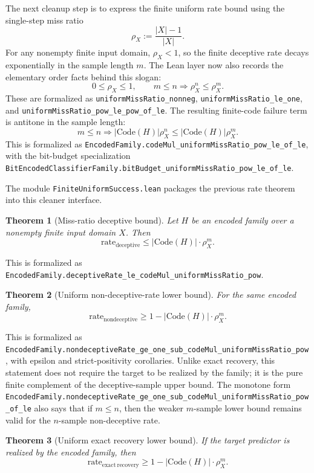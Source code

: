 \documentclass[11pt]{article}
\newtheorem{theorem}{Theorem}[section]
\theoremstyle{remark}
\begin{document}
The next cleanup step is to express the finite uniform rate bound using the
single-step miss ratio
\[
  \rho_X := \frac{|X|-1}{|X|}.
\]
For any nonempty finite input domain, \(\rho_X < 1\), so the finite deceptive
rate decays exponentially in the sample length \(m\).  The Lean layer now also
records the elementary order facts behind this slogan:
\[
  0 \le \rho_X \le 1,\qquad
  m \le n \Rightarrow \rho_X^n \le \rho_X^m.
\]
These are formalized as
\texttt{uniformMissRatio\_nonneg}, \texttt{uniformMissRatio\_le\_one}, and
\texttt{uniformMissRatio\_pow\_le\_pow\_of\_le}.  The resulting finite-code
failure term is antitone in the sample length:
\[
  m \le n \Rightarrow
  |\mathrm{Code}(H)|\rho_X^n \le |\mathrm{Code}(H)|\rho_X^m.
\]
This is formalized as
\texttt{EncodedFamily.codeMul\_uniformMissRatio\_pow\_le\_of\_le}, with the
bit-budget specialization
\texttt{BitEncodedClassifierFamily.bitBudget\_uniformMissRatio\_pow\_le\_of\_le}.

The module \texttt{FiniteUniformSuccess.lean} packages the previous rate theorem
into this cleaner interface.

\begin{theorem}[Miss-ratio deceptive bound]
Let \(H\) be an encoded family over a nonempty finite input domain \(X\).  Then
\[
  \mathrm{rate}_{\mathrm{deceptive}}
  \le
  |\mathrm{Code}(H)| \cdot \rho_X^m.
\]
\end{theorem}

\noindent
This is formalized as
\texttt{EncodedFamily.deceptiveRate\_le\_codeMul\_uniformMissRatio\_pow}.

\begin{theorem}[Uniform non-deceptive-rate lower bound]
For the same encoded family,
\[
  \mathrm{rate}_{\mathrm{nondeceptive}}
  \ge
  1 - |\mathrm{Code}(H)| \cdot \rho_X^m.
\]
\end{theorem}

\noindent
This is formalized as
\texttt{EncodedFamily.nondeceptiveRate\_ge\_one\_sub\_codeMul\_uniformMissRatio\_pow},
with epsilon and strict-positivity corollaries.  Unlike exact recovery, this
statement does not require the target to be realized by the family; it is the
pure finite complement of the deceptive-sample upper bound.  The monotone form
\texttt{EncodedFamily.nondeceptiveRate\_ge\_one\_sub\_codeMul\_uniformMissRatio\_pow\_of\_le}
also says that if \(m \le n\), then the weaker \(m\)-sample lower bound remains
valid for the \(n\)-sample non-deceptive rate.

\begin{theorem}[Uniform exact recovery lower bound]
If the target predictor is realized by the encoded family, then
\[
  \mathrm{rate}_{\mathrm{exact\ recovery}}
  \ge
  1 - |\mathrm{Code}(H)| \cdot \rho_X^m.
\]
\end{theorem}
\end{document}
